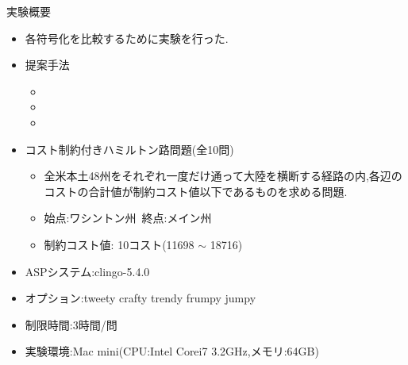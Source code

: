 \documentclass[dvipdfmx,11pt]{beamer}
\begin{document}
\begin{frame}{実験概要}
  \begin{itemize}
    \item 各符号化を比較するために実験を行った.
    \item 提案手法
      \begin{itemize}
      \item {}
      \item {}
      \item {}
      \end{itemize}
    \item コスト制約付きハミルトン路問題(全10問)
      \begin{itemize}
      \item 全米本土48州をそれぞれ一度だけ通って大陸を横断する経路の内,各辺のコストの合計値が制約コスト値以下であるものを求める問題.
      \item 始点:ワシントン州\ 終点:メイン州
      \item 制約コスト値: 10コスト(11698 $\sim$ 18716)
      \end{itemize}
    \item ASPシステム:clingo-5.4.0
    \item オプション:tweety crafty trendy frumpy jumpy
    \item 制限時間:3時間/問
    \item 実験環境:Mac mini(CPU:Intel Corei7 3.2GHz,メモリ:64GB)
  \end{itemize}
\end{frame}
\end{document}
